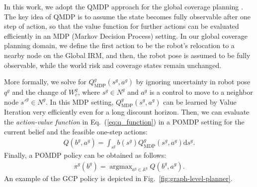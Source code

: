 \documentclass[letterpaper]{article} %
\newcommand{\phdone}[1]{} %
\newcommand{\argmax}{\mathop{\mathrm{argmax}}}
\begin{document}
\noindent
In this work, we adopt the QMDP approach for the global coverage planning \cite{littman1995learning}.
The key idea of QMDP is to assume the state becomes fully observable after one step of action, so that the value function for further actions can be evaluated efficiently in an MDP (Markov Decision Process) setting.
In our global coverage planning domain, we define the first action to be the robot's relocation to a nearby node on the Global IRM, and then, the robot pose is assumed to be fully observable, while the world risk and coverage states remain unchanged.


\phdone{QMDP Details}
More formally, we solve for $Q^g_{\mathrm{MDP}}(s^g, a^g)$ by ignoring uncertainty in robot pose $q^g$ and the change of $W^g_{c}$, where $s^g \in N^g$ and $a^g$ is a control to move to a neighbor node $s'^g \in N^g$.
In this MDP setting, $Q^g_{\mathrm{MDP}}(s^g, a^g)$ can be learned by Value Iteration very efficiently even for a long discount horizon.
%
Then, we can evaluate the \textit{action-value function} in Eq.~(\ref{eq:q_function}) in a POMDP setting for the current belief and the feasible one-step actions:
\begin{align}
  Q(b^g, a^g) = \int_{s^g} b(s^g) Q^g_{\mathrm{MDP}}(s^g, a^g) \mathrm{d}s^g.
\end{align}
%
Finally, a POMDP policy can be obtained as follows:
\begin{align}
  \pi^g(b^g) = \argmax_{a^g \in \mathbb{A}^g} Q(b^g, a^g).
\end{align}
%
An example of the GCP policy is depicted in Fig.~\ref{fig:graph-level-planner}.
\end{document}

